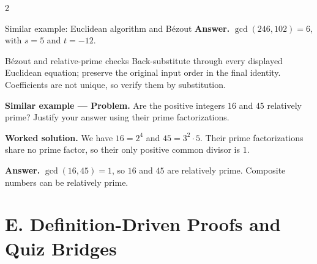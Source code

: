 \documentclass[10pt]{article}
\begin{document}
\begin{multicols}{2}
\begin{workedbox}{Similar example: Euclidean algorithm and B\'ezout}
\textbf{Answer.} $\gcd(246,102)=6$, with $s=5$ and $t=-12$.
\end{workedbox}

\newpage
\begin{methodbox}{B\'ezout and relative-prime checks}
Back-substitute through every displayed Euclidean equation; preserve the
original input order in the final identity. Coefficients are not unique, so
verify them by substitution.

\textbf{Similar example --- Problem.} Are the positive integers $16$ and
$45$ relatively prime? Justify your answer using their prime factorizations.

\textbf{Worked solution.} We have $16=2^4$ and $45=3^2\cdot5$.
Their prime factorizations share no prime factor, so their only positive
common divisor is $1$.

\textbf{Answer.} $\gcd(16,45)=1$, so $16$ and $45$ are relatively prime.
Composite numbers can be relatively prime.
\end{methodbox}
\end{multicols}
\endgroup

\thispagestyle{fancy}
\pagestyle{fancy}
\thispagestyle{fancy}
\section*{E. Definition-Driven Proofs and Quiz Bridges}
\thispagestyle{fancy}
\end{document}
